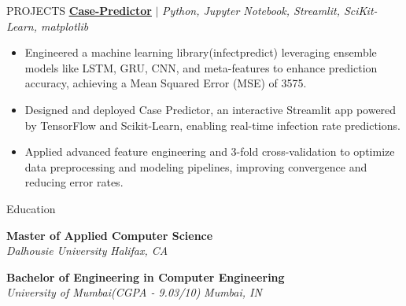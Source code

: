 \documentclass{resume} %
\begin{document}
\begin{rSection}{PROJECTS}
\href{https://github.com/RutvikJ77/Case-Predictor}
{\textbf{\underline{Case-Predictor}}} $|$\textit{ Python, Jupyter Notebook, Streamlit, SciKit-Learn, matplotlib}
\begin{itemize}
  \item Engineered a machine learning library(infectpredict) leveraging ensemble models like LSTM, GRU, CNN, and meta-features to enhance prediction accuracy, achieving a Mean Squared Error (MSE) of 3575.
  \item {Designed and deployed Case Predictor, an interactive Streamlit app powered by TensorFlow and Scikit-Learn, enabling real-time infection rate predictions.}
  \item {Applied advanced feature engineering and 3-fold cross-validation to optimize data preprocessing and modeling pipelines, improving convergence and reducing error rates.}
\end{itemize}


\end{rSection} 


\begin{rSection}{Education}

{\bf Master of Applied Computer Science \hfill {}}\\
\textit{Dalhousie University} \hfill{\textit{Halifax, CA}}

{\bf Bachelor of Engineering in Computer Engineering \hfill {}}\\
\textit{University of Mumbai(CGPA - 9.03/10)} \hfill{\textit{Mumbai, IN}}


\end{rSection}
\end{document}
